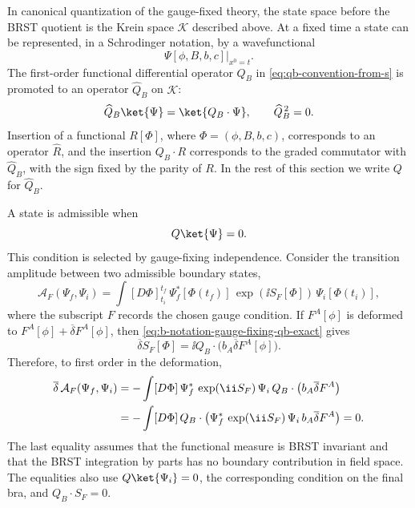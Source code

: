 In canonical quantization of the gauge-fixed theory, the state space before
the BRST quotient is the Krein space \(\mathcal K\) described above.  At a
fixed time a state can be represented, in a Schrodinger notation, by a
wavefunctional
\[
  \Psi[\phi,B,b,c]\big|_{x^0=t}.
\]
The first-order functional differential operator \(Q_B\) in
\eqref{eq:qb-convention-from-s} is promoted to an operator
\(\widehat Q_B\) on \(\mathcal K\):
\[
  \widehat Q_B\ket{\Psi}
  =
  \ket{Q_B\cdot\Psi},
  \qquad
  \widehat Q_B^{\,2}=0 .
\]
Insertion of a functional \(R[\Phi]\), where \(\Phi=(\phi,B,b,c)\), corresponds
to an operator \(\widehat R\), and the insertion \(Q_B\cdot R\) corresponds to
the graded commutator with \(\widehat Q_B\), with the sign fixed by the parity
of \(R\).  In the rest of this section we write \(Q\) for \(\widehat Q_B\).

A state is admissible when
\begin{equation}
  Q\ket{\Psi}=0 .
  \label{eq:brst-admissible-state}
\end{equation}
This condition is selected by gauge-fixing independence.  Consider the
transition amplitude between two admissible boundary states,
\[
  \mathcal A_F(\Psi_f,\Psi_i)
  =
  \int[D\Phi]_{t_i}^{t_f}\,
  \Psi_f^*[\Phi(t_f)]\,
  \exp(\ii S_F[\Phi])\,
  \Psi_i[\Phi(t_i)],
\]
where the subscript \(F\) records the chosen gauge condition.  If
\(F^A[\phi]\) is deformed to \(F^A[\phi]+\overline\delta F^A[\phi]\), then
\eqref{eq:b-notation-gauge-fixing-qb-exact} gives
\[
  \overline\delta S_F[\Phi]
  =
  \ii Q_B\cdot\bigl(b_A\overline\delta F^A[\phi]\bigr).
\]
Therefore, to first order in the deformation,
\begin{align}
  \overline\delta\,\mathcal A_F(\Psi_f,\Psi_i)
  &=
  -\int[D\Phi]\,
  \Psi_f^*\,\exp(\ii S_F)\,\Psi_i\,
  Q_B\cdot\bigl(b_A\overline\delta F^A\bigr)
  \notag\\
  &=
  -\int[D\Phi]\,
  Q_B\cdot
  \left(
    \Psi_f^*\,\exp(\ii S_F)\,\Psi_i\,
    b_A\overline\delta F^A
  \right)
  =
  0 .
  \label{eq:brst-gauge-fixing-independence}
\end{align}
The last equality assumes that the functional measure is BRST invariant and
that the BRST integration by parts has no boundary contribution in field
space.  The equalities also use \(Q\ket{\Psi_i}=0\), the corresponding
condition on the final bra, and \(Q_B\cdot S_F=0\).

